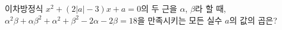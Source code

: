 이차방정식 $x^2+(2|a|-3)x+a=0$의 두 근을 $\alpha$, $\beta$라 할 때, $\alpha^2\beta+\alpha\beta^2+\alpha^2+\beta^2-2\alpha-2\beta=18$을 만족시키는 모든 실수 $a$의 값의 곱은?
